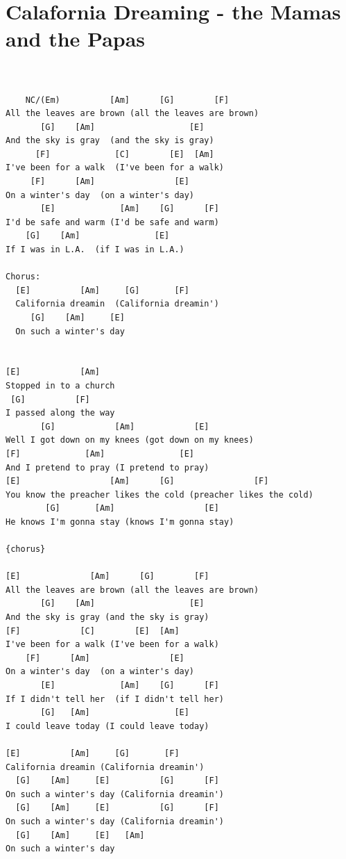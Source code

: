 \documentclass[
]{book}
\let\stdsection\section
\renewcommand\section{\clearpage\stdsection}
\begin{document}
\hypertarget{calafornia-dreaming---the-mamas-and-the-papas}{%
\section{Calafornia Dreaming - the Mamas and the Papas}\label{calafornia-dreaming---the-mamas-and-the-papas}}

\begin{verbatim}


    NC/(Em)          [Am]      [G]        [F]
All the leaves are brown (all the leaves are brown)
       [G]    [Am]                   [E]
And the sky is gray  (and the sky is gray)
      [F]             [C]        [E]  [Am]
I've been for a walk  (I've been for a walk)
     [F]      [Am]                [E]
On a winter's day  (on a winter's day)
       [E]             [Am]    [G]      [F]
I'd be safe and warm (I'd be safe and warm)
    [G]    [Am]               [E]
If I was in L.A.  (if I was in L.A.)

Chorus:
  [E]          [Am]     [G]       [F]
  California dreamin  (California dreamin')
     [G]    [Am]     [E]
  On such a winter's day


[E]            [Am]
Stopped in to a church
 [G]          [F]
I passed along the way
       [G]            [Am]            [E]
Well I got down on my knees (got down on my knees)
[F]             [Am]               [E]
And I pretend to pray (I pretend to pray)
[E]                  [Am]      [G]                [F]
You know the preacher likes the cold (preacher likes the cold)
        [G]       [Am]                  [E]
He knows I'm gonna stay (knows I'm gonna stay)

{chorus}

[E]              [Am]      [G]        [F]
All the leaves are brown (all the leaves are brown)
       [G]    [Am]                   [E]
And the sky is gray (and the sky is gray)
[F]            [C]        [E]  [Am]
I've been for a walk (I've been for a walk)
    [F]      [Am]                [E]
On a winter's day  (on a winter's day)
       [E]             [Am]    [G]      [F]
If I didn't tell her  (if I didn't tell her)
       [G]   [Am]                 [E]
I could leave today (I could leave today)

[E]          [Am]     [G]       [F]
California dreamin (California dreamin')
  [G]    [Am]     [E]          [G]      [F]
On such a winter's day (California dreamin')
  [G]    [Am]     [E]          [G]      [F]
On such a winter's day (California dreamin')
  [G]    [Am]     [E]   [Am]
On such a winter's day
\end{verbatim}
\end{document}
